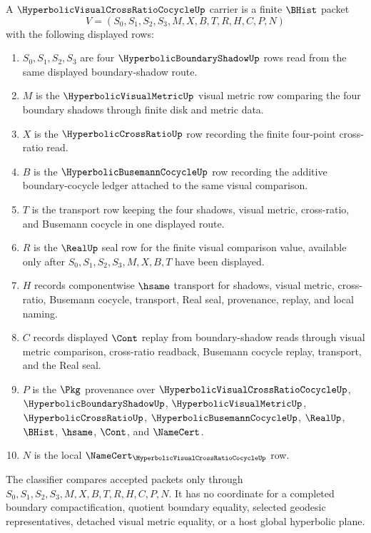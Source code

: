 \begin{definition}
\label{def:hyperbolic-visual-cross-ratio-cocycle-carrier}
A $\HyperbolicVisualCrossRatioCocycleUp$ carrier is a finite $\BHist$ packet
$$
V=(S_0,S_1,S_2,S_3,M,X,B,T,R,H,C,P,N)
$$
with the following displayed rows:
\begin{enumerate}
\item $S_0,S_1,S_2,S_3$ are four $\HyperbolicBoundaryShadowUp$ rows read from the same displayed boundary-shadow route.
\item $M$ is the $\HyperbolicVisualMetricUp$ visual metric row comparing the four boundary shadows through finite disk and metric data.
\item $X$ is the $\HyperbolicCrossRatioUp$ row recording the finite four-point cross-ratio read.
\item $B$ is the $\HyperbolicBusemannCocycleUp$ row recording the additive boundary-cocycle ledger attached to the same visual comparison.
\item $T$ is the transport row keeping the four shadows, visual metric, cross-ratio, and Busemann cocycle in one displayed route.
\item $R$ is the $\RealUp$ seal row for the finite visual comparison value, available only after $S_0,S_1,S_2,S_3,M,X,B,T$ have been displayed.
\item $H$ records componentwise $\hsame$ transport for shadows, visual metric, cross-ratio, Busemann cocycle, transport, Real seal, provenance, replay, and local naming.
\item $C$ records displayed $\Cont$ replay from boundary-shadow reads through visual metric comparison, cross-ratio readback, Busemann cocycle replay, transport, and the Real seal.
\item $P$ is the $\Pkg$ provenance over $\HyperbolicVisualCrossRatioCocycleUp$, $\HyperbolicBoundaryShadowUp$, $\HyperbolicVisualMetricUp$, $\HyperbolicCrossRatioUp$, $\HyperbolicBusemannCocycleUp$, $\RealUp$, $\BHist$, $\hsame$, $\Cont$, and $\NameCert$.
\item $N$ is the local $\NameCert_{\HyperbolicVisualCrossRatioCocycleUp}$ row.
\end{enumerate}
The classifier compares accepted packets only through $S_0,S_1,S_2,S_3,M,X,B,T,R,H,C,P,N$. It has no coordinate for a completed boundary compactification, quotient boundary equality, selected geodesic representatives, detached visual metric equality, or a host global hyperbolic plane.
\end{definition}

